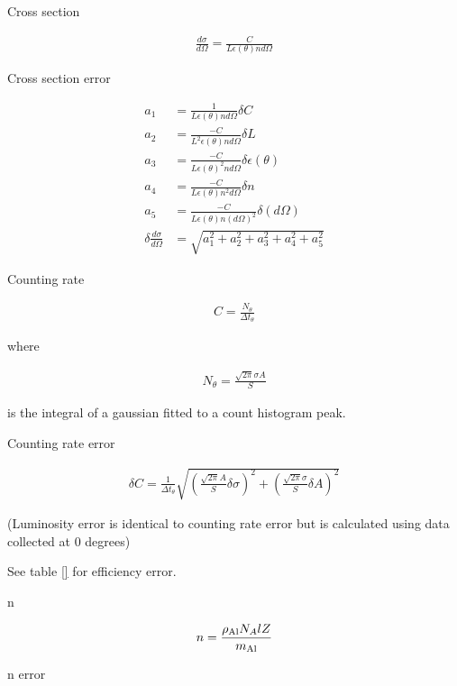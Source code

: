 Cross section

\begin{align}
	\frac{d\sigma}{d\Omega}=\frac{C}{L \epsilon(\theta) n d\Omega}
\end{align}

Cross section error

\begin{align}
   a_1 &= \frac{1}{L \epsilon(\theta) n d\Omega} \delta C                    \\
   a_2 &= \frac{-C}{L^2 \epsilon(\theta) n d \Omega} \delta L                \\
   a_3 &= \frac{-C}{L \epsilon(\theta)^2 n d\Omega} \delta \epsilon(\theta)  \\
   a_4 &= \frac{-C}{L \epsilon(\theta) n^2 d\Omega} \delta n                 \\
   a_5 &= \frac{-C}{L \epsilon(\theta) n (d\Omega)^2} \delta (d\Omega)       \\
\delta \frac{d\sigma}{d\Omega}&=\sqrt{a_1^2 + a_2^2 + a_3^2 + a_4^2 + a_5^2 }
\end{align}

Counting rate

\begin{align}
	C=\frac{N_\theta}{\Delta t_\theta}
\end{align}

where

\begin{align}
	N_\theta=\frac{\sqrt{2 \pi} \sigma A}{S}
\end{align}

is the integral of a gaussian fitted to a count histogram peak.

Counting rate error

\begin{align}
\delta C = \frac{1}{\Delta t_\theta} \sqrt{
   \left(\frac{\sqrt{2 \pi} A}{S} \delta \sigma\right)^2+
	\left(\frac{\sqrt{2 \pi} \sigma}{S} \delta A\right)^2
}
\end{align}

(Luminosity error is identical to counting rate error but is calculated using data collected at 0 degrees)

See table \ref{} for efficiency error.

n

\begin{align}
	n=\frac{\rho_{\rm Al} N_A l Z}{m_{\rm Al}}
\end{align}

n error

